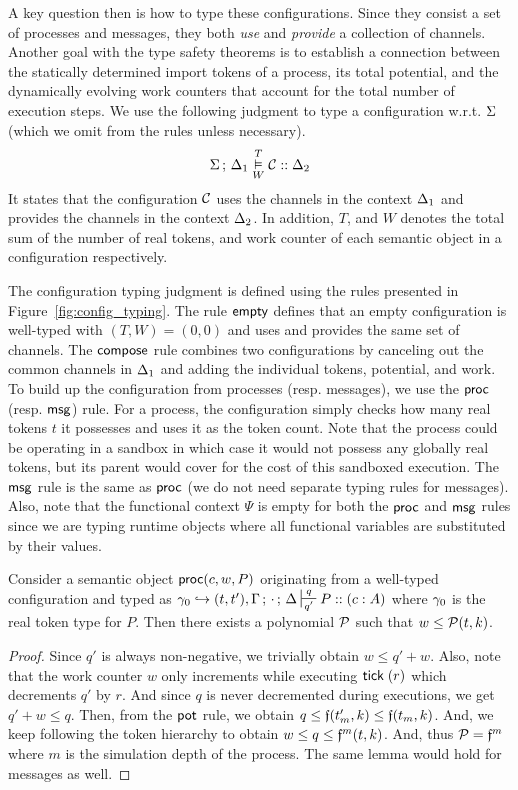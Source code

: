 A key question then is how to type these configurations.
Since they consist a set of processes and messages, they
both \emph{use} and \emph{provide} a collection of channels.
Another goal with the type safety theorems is to establish a connection
between the statically determined import tokens of a process,
its total potential, and the dynamically evolving work counters
that account for the total number of execution steps.
We use the following judgment to type a configuration w.r.t. $\Sigma$
(which we omit from the rules unless necessary).
\[
\Sigma \, ; \, \Delta_1 \overset{T}{\underset{W}{\vDash}} \mathcal{C} :: \Delta_2
\]
It states that the configuration $\mathcal{C}$
uses the channels in the context $\Delta_1$ and provides the channels in
the context $\Delta_2$.
In addition, $T$, and $W$ denotes the total sum of the number of real tokens,
and work counter of each semantic object in a configuration respectively.


The configuration typing judgment is defined using
the rules presented in Figure~\ref{fig:config_typing}.
%
The rule $\mathsf{empty}$ defines that an empty configuration
is well-typed with $(T, W) = (0, 0)$ and uses and
provides the same set of channels.
The $\mathsf{compose}$ rule combines two configurations by canceling out
the common channels in $\Delta_1$ and adding the individual tokens, potential, and work.
To build up the configuration from processes (resp. messages), we use the $\mathsf{proc}$ (resp. $\mathsf{msg}$) rule.
For a process, the configuration simply checks how many real tokens $t$ it possesses and
uses it as the token count.
Note that the process could be operating in a sandbox in which case it would not possess
any globally real tokens, but its parent would cover for the cost of this sandboxed execution.
The $\mathsf{msg}$ rule is the same as $\mathsf{proc}$ (we do not need separate typing rules for messages).
Also, note that the functional context $\Psi$ is empty for both the $\mathsf{proc}$ and $\mathsf{msg}$
rules since we are typing runtime objects where all functional variables are substituted
by their values.

\begin{lemma}\label{lem:local_ppt}
  Consider a semantic object $\mathsf{proc}(c, w, P)$ originating from a well-typed configuration and
  typed as $\K_0 \hookrightarrow (t, t'), \Tokens \semi \cdot \semi \D \entailpot{q}{q'} P :: (c : A)$
  where $\gamma_0$ is the real token type for $P$.
  Then there exists a polynomial $\mathcal{P}$ such that $w \leq \mathcal{P}(t, k)$.
\end{lemma}

\begin{proof}
  Since $q'$ is always non-negative, we trivially obtain $w \leq q'+w$.
  Also, note that the work counter $w$ only increments while executing $\mathsf{tick} \; (r)$
  which decrements $q'$ by $r$.
  And since $q$ is never decremented during executions, we get $q'+w \leq q$.
  Then, from the $\mathsf{pot}$ rule, we obtain $q \leq \mathfrak{f}(t_m', k) \leq \mathfrak{f}(t_m, k)$.
  And, we keep following the token hierarchy to obtain
  $w \leq q \leq \mathfrak{f}^{m}(t, k)$.
  And, thus $\mathcal{P} = \mathfrak{f}^{m}$ where $m$ is the simulation depth of the process.
  The same lemma would hold for messages as well.
\end{proof}


